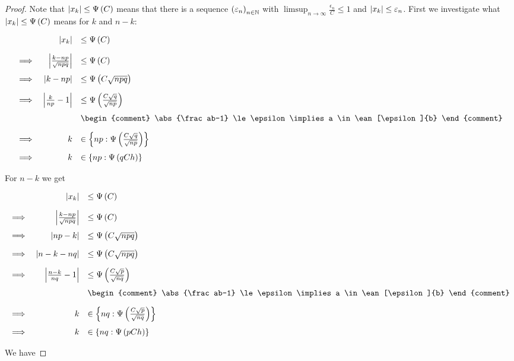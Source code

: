 \begin{proof}
  Note that $\left|{x_{k}}\right|\le \Psi\left( {C} \right)$ means that there is a sequence $\left({\varepsilon_n}\right)_{{n}\in\mathbb N}$ with $\limsup_{n\to\infty} \frac{\epsilon_n}{C} \le 1$ and $\left|{x_{k}}\right| \le \varepsilon_n$. First we investigate what $\left|{x_{k}}\right| \le \Psi\left( {C} \right)$ means for $k$ and $n-k$:

  \begin{align}
    \begin{array}{rrl}
      & \abs{\x} & \le \bigpsi{C} \bnl
      \implies & \abs{\frac{k-np}{\sqrt{npq}}} & \le \bigpsi{C} \bnl
      \implies & \abs{k-np} & \le \bigpsi{C\sqrt{npq}} \bnl
      \implies & \abs{\frac k{np}-1} & \le \bigpsi{\frac{C\sqrt{q}}{\sqrt{np}}} \bnl
      && \begin{comment}
       \abs{\frac ab-1} \le \epsilon \implies a \in \ean[\epsilon]{b}
      \end{comment} \bnl
      \implies & k & \in \ean[\bigpsi{\frac{C\sqrt{q}}{\sqrt{np}}}]{np} \bnl
      \implies & k & \in \ean[\bigpsi{qCh}]{np}
    \end{array}
  \end{align}

  \noindent For $n-k$ we get

  \begin{align}
    \begin{array}{rrl}
      & \abs{\x} & \le \bigpsi{C} \bnl
      \implies & \abs{\frac{k-np}{\sqrt{npq}}} & \le \bigpsi{C} \bnl
      \implies & \abs{np-k} & \le \bigpsi{C\sqrt{npq}} \bnl
      \implies & \abs{n-k-nq} & \le \bigpsi{C\sqrt{npq}} \bnl
      \implies & \abs{\frac {n-k}{nq}-1} & \le \bigpsi{\frac{C\sqrt{p}}{\sqrt{nq}}} \bnl
      && \begin{comment}
       \abs{\frac ab-1} \le \epsilon \implies a \in \ean[\epsilon]{b}
      \end{comment} \bnl
      \implies & k & \in \ean[\bigpsi{\frac{C\sqrt{p}}{\sqrt{nq}}}]{nq} \bnl
      \implies & k & \in \ean[\bigpsi{pCh}]{nq}
    \end{array}
  \end{align}

  \noindent We have


\end{proof}
